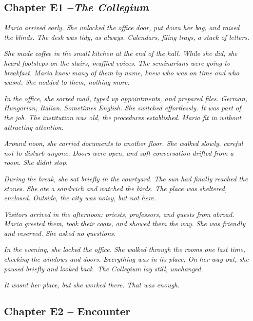 \documentclass[
]{article}
\begin{document}
\subsection{\texorpdfstring{Chapter E1 --\emph{The Collegium}}{Chapter E1 --The Collegium}}\label{chapter-e1-the-collegium}

\emph{Maria arrived early. She unlocked the office door, put down her bag, and raised the blinds. The desk was tidy, as always. Calendars, filing trays, a stack of letters.}

\emph{She made coffee in the small kitchen at the end of the hall. While she did, she heard footsteps on the stairs, muffled voices. The seminarians were going to breakfast. Maria knew many of them by name, knew who was on time and who wasn\textquotesingle t. She nodded to them, nothing more.}

\emph{In the office, she sorted mail, typed up appointments, and prepared files. German, Hungarian, Italian. Sometimes English. She switched effortlessly. It was part of the job. The institution was old, the procedures established. Maria fit in without attracting attention.}

\emph{Around noon, she carried documents to another floor. She walked slowly, careful not to disturb anyone. Doors were open, and soft conversation drifted from a room. She didn\textquotesingle t stop.}

\emph{During the break, she sat briefly in the courtyard. The sun had finally reached the stones. She ate a sandwich and watched the birds. The place was sheltered, enclosed. Outside, the city was noisy, but not here.}

\emph{Visitors arrived in the afternoon: priests, professors, and guests from abroad. Maria greeted them, took their coats, and showed them the way. She was friendly and reserved. She asked no questions.}

\emph{In the evening, she locked the office. She walked through the rooms one last time, checking the windows and doors. Everything was in its place. On her way out, she paused briefly and looked back. The Collegium lay still, unchanged.}

\emph{It wasn\textquotesingle t her place, but she worked there. That was enough.}

\subsection{Chapter E2 -- Encounter}\label{chapter-e2-encounter}
\end{document}
